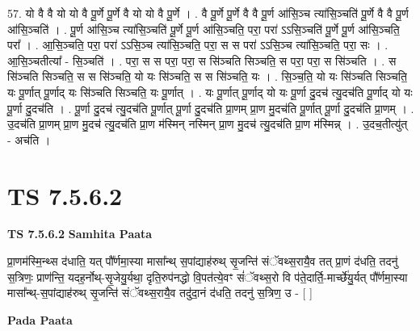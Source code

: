 \documentclass[17pt]{extarticle}
\begin{document}
57. यो वै वै यो यो वै पू॒र्णे पू॒र्णे वै यो यो वै पू॒र्णे । . वै पू॒र्णे पू॒र्णे वै वै पू॒र्ण आ॑सि॒ञ्च त्या॑सि॒ञ्चति॑ पू॒र्णे वै वै पू॒र्ण आ॑सि॒ञ्चति॑ । . पू॒र्ण आ॑सि॒ञ्च त्या॑सि॒ञ्चति॑ पू॒र्णे पू॒र्ण आ॑सि॒ञ्चति॒ परा॒ परा॑ ऽऽसि॒ञ्चति॑ पू॒र्णे पू॒र्ण आ॑सि॒ञ्चति॒ परा᳚ । . आ॒सि॒ञ्चति॒ परा॒ परा॑ ऽऽसि॒ञ्च त्या॑सि॒ञ्चति॒ परा॒ स स परा॑ ऽऽसि॒ञ्च त्या॑सि॒ञ्चति॒ परा॒ सः । . आ॒सि॒ञ्चतीत्या᳚ - सि॒ञ्चति॑ । . परा॒ स स परा॒ परा॒ स सि॑ञ्चति सिञ्चति॒ स परा॒ परा॒ स सि॑ञ्चति । . स सि॑ञ्चति सिञ्चति॒ स स सि॑ञ्चति॒ यो यः सि॑ञ्चति॒ स स सि॑ञ्चति॒ यः । . सि॒ञ्च॒ति॒ यो यः सि॑ञ्चति सिञ्चति॒ यः पू॒र्णात् पू॒र्णाद् यः सि॑ञ्चति सिञ्चति॒ यः पू॒र्णात् । . यः पू॒र्णात् पू॒र्णाद् यो यः पू॒र्णा दु॒दच॑ त्यु॒दच॑ति पू॒र्णाद् यो यः पू॒र्णा दु॒दच॑ति । . पू॒र्णा दु॒दच॑ त्यु॒दच॑ति पू॒र्णात् पू॒र्णा दु॒दच॑ति प्रा॒णम् प्रा॒ण मु॒दच॑ति पू॒र्णात् पू॒र्णा दु॒दच॑ति प्रा॒णम् । . उ॒दच॑ति प्रा॒णम् प्रा॒ण मु॒दच॑ त्यु॒दच॑ति प्रा॒ण म॑स्मिन् नस्मिन् प्रा॒ण मु॒दच॑ त्यु॒दच॑ति प्रा॒ण म॑स्मिन्न् । . उ॒दच॒तीत्यु॑त् - अच॑ति । \newline
\pagebreak
{}

\section{ TS 7.5.6.2 }

\textbf{TS 7.5.6.2 } \newline
\textbf{Samhita Paata} \newline

प्रा॒णम॑स्मि॒न्थ्स द॑धाति॒ यत् पौ᳚र्णमा॒स्या मासा᳚न्थ् स॒पांद्याह॑रुथ् सृ॒जन्ति॑ संॅवथ्स॒रायै॒व तत् प्रा॒णं द॑धति॒ तदनु॑ स॒त्रिणः॒ प्राण॑न्ति॒ यदह॒र्नोथ्-सृ॒जेयु॒र्यथा॒ दृति॒रुप॑नद्धो वि॒पत॑त्ये॒वꣳ सं॑ॅवथ्स॒रो वि प॑ते॒दार्ति॒-मार्च्छे॑यु॒र्यत् पौ᳚र्णमा॒स्या मासा᳚न्थ्-स॒पांद्याह॑रुथ् सृ॒जन्ति॑ संॅवथ्स॒रायै॒व तदु॑दा॒नं द॑धति॒ तदनु॑ स॒त्रिण॒ उ - [  ] \newline

\textbf{Pada Paata} \newline
\end{document}
